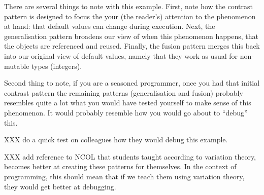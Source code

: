 There are several things to note with this example.
First, note how the contrast pattern is designed to focus the your (the 
reader's) attention to the phenomenon at hand: that default values can change 
during execution.
Next, the generalisation pattern broadens our view of when this phenomenon 
happens, that the objects are referenced and reused.
Finally, the fusion pattern merges this back into our original view of default 
values, namely that they work as usual for non-mutable types (\eg integers).

Second thing to note, if you are a seasoned programmer, once you had that 
initial contrast pattern the remaining patterns (generalisation and fusion) 
probably resembles quite a lot what you would have tested yourself to make 
sense of this phenomenon.
It would probably resemble how you would go about to \enquote{debug} this.

XXX do a quick test on colleagues how they would debug this example.

XXX add reference to NCOL that students taught according to variation theory, 
becomes better at creating these patterns for themselves.
In the context of programming, this should mean that if we teach them using 
variation theory, they would get better at debugging.

